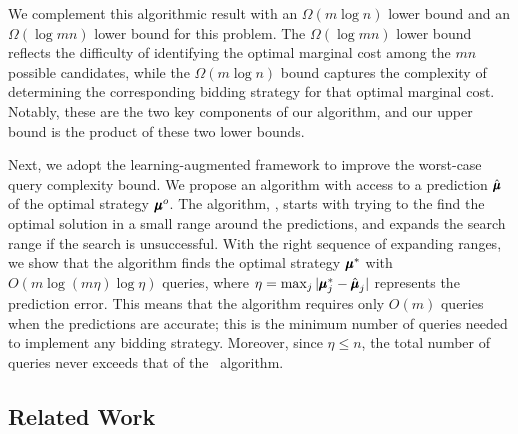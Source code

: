 {We complement this algorithmic result with an $\Omega(m \log n)$ lower bound and an $\Omega(\log mn)$ lower bound for this problem. The $\Omega(\log mn)$ lower bound reflects the difficulty of identifying the optimal marginal cost among the $mn$ possible candidates, while the $\Omega(m \log n)$ bound captures the complexity of determining the corresponding bidding strategy for that optimal marginal cost. Notably, these are the two key components of our algorithm, and our upper bound is the product of these two lower bounds.}%

Next, we adopt the learning-augmented framework to improve the worst-case query complexity bound.
We propose an algorithm with access to a prediction \(\hat{\pmb{\mu}}\) of the
optimal strategy \(\mathbf{\pmb{\mu}}^o\). The algorithm, \bmom, starts with trying to the find the optimal solution in a small range around the predictions, and expands the search range if the search is unsuccessful. With the right sequence of expanding ranges, we show that the algorithm finds the optimal strategy \(\pmb{\mu}^*\) with \(O(m \log (m\eta) \log \eta)\) queries, where \(\eta = \max_{j}|\pmb{\mu}^*_j - \hat{\pmb{\mu}}_j|\) represents the prediction error. 
This means that the algorithm requires only \(O(m)\) queries when the predictions are accurate; this is the minimum number of queries needed to implement any bidding strategy. Moreover, since \(\eta \leq n\), the total number of queries never exceeds that of the \mom\ algorithm.



\subsection{Related Work}
